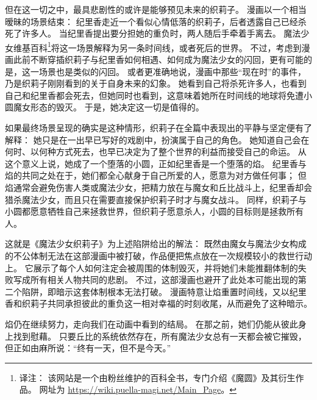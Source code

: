 但在这一切之中，最具悲剧性的或许是能够预见未来的织莉子。
漫画以一个相当暧昧的场景结束：
纪里香走近一个看似心情低落的织莉子，后者透露自己已经杀死了许多人。
当纪里香提出要分担她的重负时，两人随后手牵着手离去。
魔法少女维基百科\footnote{%
    译注：
    该网站是一个由粉丝维护的百科全书，专门介绍《魔圆》及其衍生作品。
    网址为 \url{https://wiki.puella-magi.net/Main_Page}。
}将这一场景解释为另一条时间线，或者死后的世界\cite{puella-magi-wiki2015-oriko}。
不过，考虑到漫画此前不断穿插织莉子与纪里香如何相遇、如何成为魔法少女的闪回，更有可能的是，这一场景也是类似的闪回。
或者更准确地说，漫画中那些“现在时”的事件，乃是织莉子刚刚看到的关于自身未来的幻象。
她看到自己将杀死许多人，也看到自己和纪里香都会死去，但她同时也看到，这意味着她所在时间线的地球将免遭小圆魔女形态的毁灭。
于是，她决定这一切是值得的。

如果最终场景呈现的确实是这种情形，织莉子在全篇中表现出的平静与坚定便有了解释：
她只是在一出早已写好的戏剧中，扮演属于自己的角色。
她知道自己会在何时、以何种方式死去，也早已决定为了整个世界的利益而接受自己的命运。
从这个意义上说，她成了一个堕落的小圆，正如纪里香是一个堕落的焰。
纪里香与焰的共同之处在于，她们都全心献身于自己所爱的人，愿意为对方做任何事；
但焰通常会避免伤害人类或魔法少女，把精力放在与魔女和丘比战斗上，纪里香却会猎杀魔法少女，而且只在需要直接保护织莉子时才与魔女战斗。
同样，织莉子与小圆都愿意牺牲自己来拯救世界，但织莉子愿意杀人，小圆的目标则是拯救所有人。

这就是《魔法少女织莉子》为上述陷阱给出的解法：
既然由魔女与魔法少女构成的不公体制无法在这部漫画中被打破，作品便把焦点放在一次规模较小的救世行动上。
它展示了每个人如何注定会被周围的体制毁灭，并将她们未能推翻体制的失败写成所有相关人物共同的悲剧。
不过，这部漫画也避开了此处本可能出现的第二个陷阱，即暗示这套体制根本无法打破。
漫画特意让焰重置时间线，又以纪里香和织莉子共同承担彼此的重负这一相对幸福的时刻收尾，从而避免了这种暗示。

焰仍在继续努力，走向我们在动画中看到的结局。
在那之前，她们仍能从彼此身上找到慰藉。
只要丘比的系统依然存在，所有魔法少女总有一天都会被它摧毁，但正如由麻所说：“终有一天，但不是今天。”
